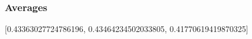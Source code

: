 \documentclass{article}
\begin{document}
\subsubsection{Averages}
[0.43363027724786196, 0.43464234502033805, 0.41770619419870325]

\begin{center}
\end{center}
\end{document}

